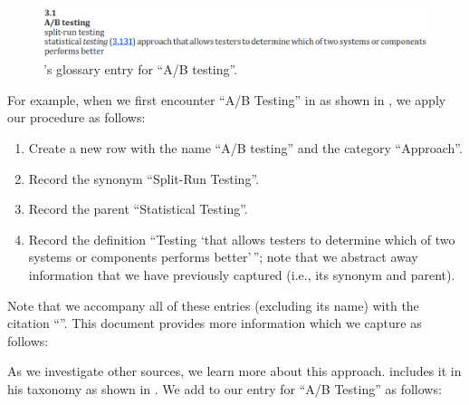 \begin{figure}[bt!]
    \includegraphics[width=\linewidth]{assets/images/a-b testing.png}
    \caption{ \citet[p.~1]{IEEE2022}'s glossary entry for
        ``A/B testing''.}\label{fig:IEEE-A-B-Testing}
\end{figure}

For example, when we first encounter ``A/B Testing'' in
\citep[p.~1, 36]{IEEE2022} as shown in , we apply
our procedure as follows:
\begin{enumerate}
    \item Create a new row with the name ``A/B testing'' and the category
          ``Approach''.
    \item Record the synonym ``Split-Run Testing''.
    \item Record the parent ``Statistical Testing''.
    \item Record the definition ``Testing `that allows testers to determine
          which of two systems or components performs better'\,''; note that
          we abstract away information that we have previously captured (i.e.,
          its synonym and parent).
\end{enumerate}
\ifnotpaper\newpage\noindent\fi
Note that we accompany all of these entries (excluding its name) with the
citation ``\citep[pp.~1, 36]{IEEE2022}''. This document provides more
information which we capture as follows:
As we investigate other sources, we learn more about this approach. \ifnotpaper
\else \citeauthor{Firesmith2015} \fi \citet[p.~58]{Firesmith2015} includes it
in his taxonomy as shown in . We add to our
entry for ``A/B Testing'' as follows:

